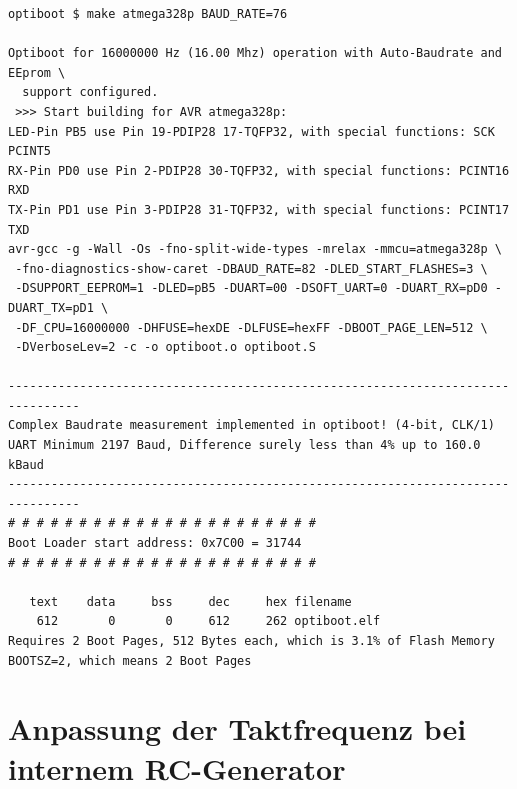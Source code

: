 \begin{verbatim}
optiboot $ make atmega328p BAUD_RATE=76

Optiboot for 16000000 Hz (16.00 Mhz) operation with Auto-Baudrate and EEprom \
  support configured.
 >>> Start building for AVR atmega328p:
LED-Pin PB5 use Pin 19-PDIP28 17-TQFP32, with special functions: SCK PCINT5
RX-Pin PD0 use Pin 2-PDIP28 30-TQFP32, with special functions: PCINT16 RXD
TX-Pin PD1 use Pin 3-PDIP28 31-TQFP32, with special functions: PCINT17 TXD
avr-gcc -g -Wall -Os -fno-split-wide-types -mrelax -mmcu=atmega328p \
 -fno-diagnostics-show-caret -DBAUD_RATE=82 -DLED_START_FLASHES=3 \
 -DSUPPORT_EEPROM=1 -DLED=pB5 -DUART=00 -DSOFT_UART=0 -DUART_RX=pD0 -DUART_TX=pD1 \
 -DF_CPU=16000000 -DHFUSE=hexDE -DLFUSE=hexFF -DBOOT_PAGE_LEN=512 \
 -DVerboseLev=2 -c -o optiboot.o optiboot.S

--------------------------------------------------------------------------------
Complex Baudrate measurement implemented in optiboot! (4-bit, CLK/1)
UART Minimum 2197 Baud, Difference surely less than 4% up to 160.0 kBaud
--------------------------------------------------------------------------------
# # # # # # # # # # # # # # # # # # # # # #
Boot Loader start address: 0x7C00 = 31744
# # # # # # # # # # # # # # # # # # # # # #

   text	   data	    bss	    dec	    hex	filename
    612	      0	      0	    612	    262	optiboot.elf
Requires 2 Boot Pages, 512 Bytes each, which is 3.1% of Flash Memory
BOOTSZ=2, which means 2 Boot Pages

\end{verbatim}


\section{Anpassung der Taktfrequenz bei internem RC-Generator}

